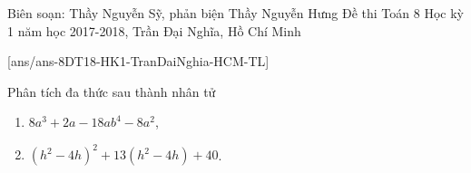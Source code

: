 \begin{name}
{Biên soạn: Thầy Nguyễn Sỹ, phản biện Thầy Nguyễn Hưng}
{Đề thi Toán 8 Học kỳ 1 năm học 2017-2018, Trần Đại Nghĩa, Hồ Chí Minh }
\end{name}
\setcounter{bt}{0}
[ans/ans-8DT18-HK1-TranDaiNghia-HCM-TL]
\begin{bt}%
	Phân tích đa thức sau thành nhân tử
	\begin{enumerate}
		\item $8a^3+2a-18ab^4-8a^2$,
		\item $(h^2-4h)^2+13(h^2-4h)+40$.
	\end{enumerate}
\end{bt}

